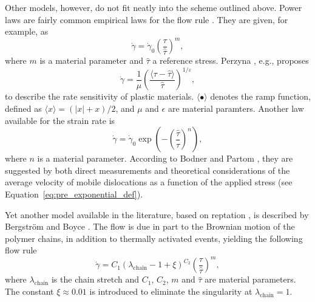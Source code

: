 Other models, however, do not fit neatly into the scheme outlined above.
Power laws are fairly common empirical laws for the flow rule \citep{brownPowerlawCreepEquation1980}.
They are given, for example, as \citep{bergstromMechanicsSolidPolymers2015}
\begin{equation}
	\label{eq:flow_rule_power_law}
	\dot \gamma = \dot \gamma_0 \left(\frac{\tau}{\hat \tau}\right)^m,
\end{equation}
where $m$ is a material parameter and $\hat \tau$ a reference stress.
Perzyna \citep{perzynaConstitutiveEquationsRate1963}, e.g., proposes
\begin{equation}
\label{eq:flow_rule_perzyna}
  \dot \gamma = \frac{1}{\mu}\left(\frac{\langle\tau - \hat\tau\rangle}{\hat\tau}\right)^{1/\varepsilon},
\end{equation}
to describe the rate sensitivity of plastic materials.
$\langle\bullet\rangle$ denotes the ramp function, defined as $\langle x\rangle = (|x| + x) /2$, and $\mu$ and $\epsilon$ are material paramters.
Another law available for the strain rate is \citep{kellyInfluenceLimitingDislocation1974, bodnerLargeDeformationElasticViscoplastic1972}
\begin{equation}
  \label{eq:exp_flow_law}
	\dot \gamma = \dot \gamma_0 \exp\left(-\left(\frac{\hat \tau}{\tau}\right)^n\right),
\end{equation}
where $n$ is a material parameter.
According to Bodner and Partom \citep{bodnerLargeDeformationElasticViscoplastic1972}, they are suggested by both direct measurements and theoretical considerations of the average velocity of mobile dislocations as a function of the applied stress (see Equation~\eqref{eq:pre_exponential_def}).

Yet another model available in the literature, based on reptation \citep{doiDynamicsConcentratedPolymer1978a}, is described by Bergström and Boyce \citep{bergstromConstitutiveModelingLarge1998, bergstromConstitutiveModelingTimedependent2001}.
The flow is due in part to the Brownian motion of the polymer chains, in addition to thermally activated events, yielding the following flow rule
\begin{equation}
	\label{eq:bb_reptation_model}
	\dot \gamma = C_1(\lambda_\text{chain} -1 + \xi)^{C_2}\left(\frac{\tau}{\hat\tau}\right)^{m},
\end{equation}
where $\lambda_\text{chain}$ is the chain stretch and $C_1$, $C_2$, $m$ and $\hat \tau$ are material parameters.
The constant $\xi\approx 0.01$ is introduced to eliminate the singularity at $\lambda_\text{chain}=1$.

